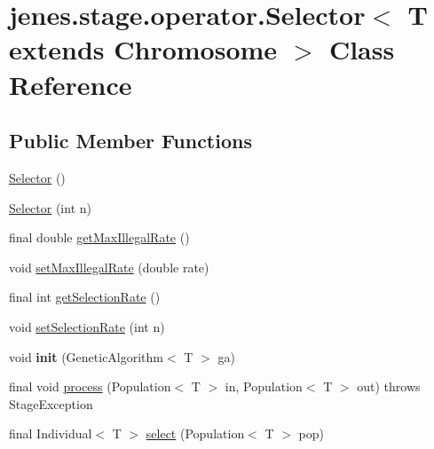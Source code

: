 \hypertarget{classjenes_1_1stage_1_1operator_1_1_selector_3_01_t_01extends_01_chromosome_01_4}{
\section{jenes.stage.operator.Selector$<$ T extends Chromosome $>$ Class Reference}
\label{classjenes_1_1stage_1_1operator_1_1_selector_3_01_t_01extends_01_chromosome_01_4}
}
\subsection*{Public Member Functions}
\begin{CompactItemize}
\item 
\hyperlink{classjenes_1_1stage_1_1operator_1_1_selector_3_01_t_01extends_01_chromosome_01_4_83052368d6df966944bc5178f1eebed0}{Selector} ()
\item 
\hyperlink{classjenes_1_1stage_1_1operator_1_1_selector_3_01_t_01extends_01_chromosome_01_4_07f05455c1fabfb8ad3f6468a653aed8}{Selector} (int n)
\item 
final double \hyperlink{classjenes_1_1stage_1_1operator_1_1_selector_3_01_t_01extends_01_chromosome_01_4_6e6f7842d22da347196a8cd772bea0e1}{getMaxIllegalRate} ()
\item 
void \hyperlink{classjenes_1_1stage_1_1operator_1_1_selector_3_01_t_01extends_01_chromosome_01_4_68ffd7e37d617f2f71628ce3659a8457}{setMaxIllegalRate} (double rate)
\item 
final int \hyperlink{classjenes_1_1stage_1_1operator_1_1_selector_3_01_t_01extends_01_chromosome_01_4_17809883b498ec5764c5aa38d04bda8b}{getSelectionRate} ()
\item 
void \hyperlink{classjenes_1_1stage_1_1operator_1_1_selector_3_01_t_01extends_01_chromosome_01_4_a67094343d09f80b0ce35d0f20a517d5}{setSelectionRate} (int n)
\item 
\hypertarget{classjenes_1_1stage_1_1operator_1_1_selector_3_01_t_01extends_01_chromosome_01_4_780969225a2e48774e71af8bd4e0063e}{
void \textbf{init} (GeneticAlgorithm$<$ T $>$ ga)}
\label{classjenes_1_1stage_1_1operator_1_1_selector_3_01_t_01extends_01_chromosome_01_4_780969225a2e48774e71af8bd4e0063e}

\item 
final void \hyperlink{classjenes_1_1stage_1_1operator_1_1_selector_3_01_t_01extends_01_chromosome_01_4_11275bed8b009ece669a5c88c6e10b55}{process} (Population$<$ T $>$ in, Population$<$ T $>$ out)  throws StageException 
\item 
final Individual$<$ T $>$ \hyperlink{classjenes_1_1stage_1_1operator_1_1_selector_3_01_t_01extends_01_chromosome_01_4_9ef7b0bef2ffcb84eeb231ae37ab0239}{select} (Population$<$ T $>$ pop)
\end{CompactItemize}
